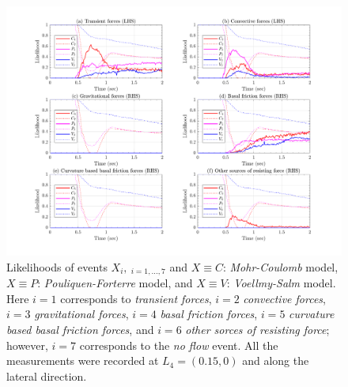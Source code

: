 \documentclass{article}
\begin{document}
\begin{figure}[H]
        \centering
        \includegraphics[width=1\textwidth]{InclinedPlane/LocalRecords/DominancePrY_L4.png}
        \caption{Likelihoods of events $X_i, \ _{i=1,...,7}$ and $X \equiv C$: \emph{Mohr-Coulomb} model, $X \equiv P$: \emph{Pouliquen-Forterre} model, and $X \equiv V$: \emph{Voellmy-Salm} model. Here $i=1$ corresponds to \emph{transient forces}, $i=2$ \emph{convective forces}, $i=3$ \emph{gravitational forces}, $i=4$ \emph{basal friction forces}, $i=5$ \emph{curvature based basal friction forces}, and $i=6$ \emph{other sorces of resisting force}; however, $i=7$ corresponds to the \emph{no flow} event. All the measurements were recorded at $L_4=(0.15,0)$ and along the lateral direction.}
        \label{fig:Ramp-FYDominance-L4}
\end{figure}
\end{document}
